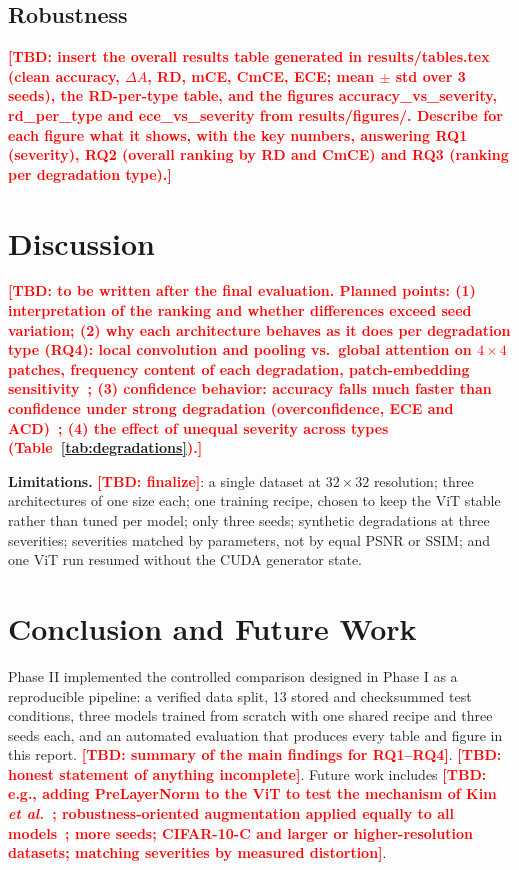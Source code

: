 \documentclass[conference]{IEEEtran}
\newcommand{\tbd}[1]{\textcolor{red}{\textbf{[TBD: #1]}}}
\begin{document}
\subsection{Robustness}
\tbd{insert the overall results table generated in results/tables.tex (clean accuracy, $\Delta A$, RD, mCE, CmCE, ECE; mean $\pm$ std over 3 seeds), the RD-per-type table, and the figures accuracy\_vs\_severity, rd\_per\_type and ece\_vs\_severity from results/figures/. Describe for each figure what it shows, with the key numbers, answering RQ1 (severity), RQ2 (overall ranking by RD and CmCE) and RQ3 (ranking per degradation type).}

\section{Discussion}
\tbd{to be written after the final evaluation. Planned points: (1) interpretation of the ranking and whether differences exceed seed variation; (2) why each architecture behaves as it does per degradation type (RQ4): local convolution and pooling vs.\ global attention on $4\times4$ patches, frequency content of each degradation, patch-embedding sensitivity~\cite{kim2023,liu2024}; (3) confidence behavior: accuracy falls much faster than confidence under strong degradation (overconfidence, ECE and ACD)~\cite{erkara2026,guo2017}; (4) the effect of unequal severity across types (Table~\ref{tab:degradations}).}

\textbf{Limitations.} \tbd{finalize}: a single dataset at $32\times32$ resolution; three architectures of one size each; one training recipe, chosen to keep the ViT stable rather than tuned per model; only three seeds; synthetic degradations at three severities; severities matched by parameters, not by equal PSNR or SSIM; and one ViT run resumed without the CUDA generator state.

\section{Conclusion and Future Work}
Phase II implemented the controlled comparison designed in Phase I as a reproducible pipeline: a verified data split, 13 stored and checksummed test conditions, three models trained from scratch with one shared recipe and three seeds each, and an automated evaluation that produces every table and figure in this report. \tbd{summary of the main findings for RQ1--RQ4}. \tbd{honest statement of anything incomplete}. Future work includes \tbd{e.g., adding PreLayerNorm to the ViT to test the mechanism of Kim \emph{et al.}~\cite{kim2023}; robustness-oriented augmentation applied equally to all models~\cite{nam2024}; more seeds; CIFAR-10-C and larger or higher-resolution datasets; matching severities by measured distortion}.



\end{document}
